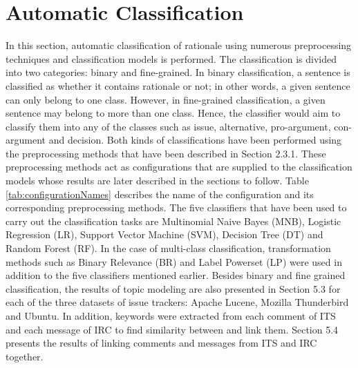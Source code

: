 \documentclass[a4paper,12pt,twoside]{report}
\begin{document}

\chapter{Automatic Classification}

In this section, automatic classification of rationale using numerous preprocessing techniques and classification models is performed. The classification is divided into two categories: binary and fine-grained. In binary classification, a sentence is classified as whether it contains rationale or not; in other words, a given sentence can only belong to one class. However, in fine-grained classification, a given sentence may belong to more than one class. Hence, the classifier would aim to classify them into any of the classes such as issue, alternative, pro-argument, con-argument and decision. Both kinds of classifications have been performed using the preprocessing methods that have been described in Section 2.3.1. These preprocessing methods act as configurations that are supplied to the classification models whose results are later described in the sections to follow. Table \ref{tab:configurationNames} describes the name of the configuration and its corresponding preprocessing methods. The five classifiers that have been used to carry out the classification tasks are Multinomial Naive Bayes (MNB), Logistic Regression (LR), Support Vector Machine (SVM), Decision Tree (DT) and Random Forest (RF). In the case of multi-class classification, transformation methods such as Binary Relevance (BR) and Label Powerset (LP) were used in addition to the five classifiers mentioned earlier. 
\newline \newline
Besides binary and fine grained classification, the results of topic modeling are also presented in Section 5.3 for each of the three datasets of issue trackers: Apache Lucene, Mozilla Thunderbird and Ubuntu. In addition, keywords were extracted from each comment of ITS and each message of IRC to find similarity between and link them. Section 5.4 presents the results of linking comments and messages from ITS and IRC together. 
\end{document}
